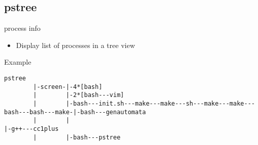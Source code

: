 \subsection{pstree}

\begin{frame}[fragile]{process info}
  \begin{itemize}
    \pause \item Display list of processes in a tree view
  \end{itemize}
  \pause
  
  \begin{exampleblock}{Example}
    \begin{lstlisting}[showstringspaces=false]
pstree
        |-screen-|-4*[bash]
        |        |-2*[bash---vim]
        |        |-bash---init.sh---make---make---sh---make---make---bash---bash---make-|-bash---genautomata
        |        |                                                                      |-g++---cc1plus
        |        |-bash---pstree
    \end{lstlisting}
  \end{exampleblock}
\end{frame}
